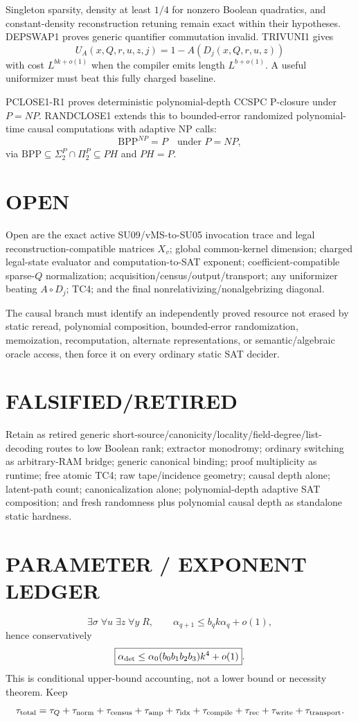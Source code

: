 \documentclass[11pt]{article}
\begin{document}
Singleton sparsity, density at least \(1/4\) for nonzero Boolean quadratics, and constant-density reconstruction retuning remain exact within their hypotheses. DEPSWAP1 proves generic quantifier commutation invalid. TRIVUNI1 gives
\[
U_A(x,Q,r,u,z,j)=1-A(D_j(x,Q,r,u,z))
\]
with cost \(L^{bk+o(1)}\) when the compiler emits length \(L^{b+o(1)}\). A useful uniformizer must beat this fully charged baseline.

PCLOSE1-R1 proves deterministic polynomial-depth CCSPC P-closure under \(P=NP\). RANDCLOSE1 extends this to bounded-error randomized polynomial-time causal computations with adaptive NP calls:
\[
\mathrm{BPP}^{NP}=P\quad\text{under }P=NP,
\]
via \(\mathrm{BPP}\subseteq\Sigma_2^P\cap\Pi_2^P\subseteq PH\) and \(PH=P\).

\section*{OPEN}
Open are the exact active SU09/vMS-to-SU05 invocation trace and legal reconstruction-compatible matrices \(X_v\); global common-kernel dimension; charged legal-state evaluator and computation-to-SAT exponent; coefficient-compatible sparse-\(Q\) normalization; acquisition/census/output/transport; any uniformizer beating \(A\circ D_j\); TC4; and the final nonrelativizing/nonalgebrizing diagonal.

The causal branch must identify an independently proved resource not erased by static reread, polynomial composition, bounded-error randomization, memoization, recomputation, alternate representations, or semantic/algebraic oracle access, then force it on every ordinary static SAT decider.

\section*{FALSIFIED/RETIRED}
Retain as retired generic short-source/canonicity/locality/field-degree/list-decoding routes to low Boolean rank; extractor monodromy; ordinary switching as arbitrary-RAM bridge; generic canonical binding; proof multiplicity as runtime; free atomic TC4; raw tape/incidence geometry; causal depth alone; latent-path count; canonicalization alone; polynomial-depth adaptive SAT composition; and fresh randomness plus polynomial causal depth as standalone static hardness.

\section*{PARAMETER / EXPONENT LEDGER}
\[
\boxed{\exists\sigma\;\forall u\;\exists z\;\forall y\;R},
\qquad
\alpha_{q+1}\le b_qk\alpha_q+o(1),
\]
hence conservatively
\[
\boxed{\alpha_{\rm det}\le\alpha_0(b_0b_1b_2b_3)k^4+o(1)}.
\]
This is conditional upper-bound accounting, not a lower bound or necessity theorem. Keep
\[
\tau_{\rm total}=\tau_Q+\tau_{\rm norm}+\tau_{\rm census}+\tau_{\rm amp}
+\tau_{\rm idx}+\tau_{\rm compile}+\tau_{\rm rec}+\tau_{\rm write}+\tau_{\rm transport}.
\]
\end{document}
